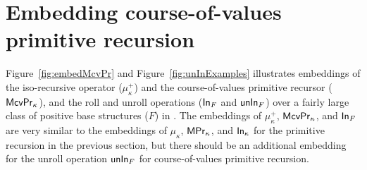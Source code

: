 \section{Embedding course-of-values primitive recursion}
\label{sec:fixi:cv}
Figure~\ref{fig:embedMcvPr} and Figure~\ref{fig:unInExamples}
illustrates embeddings of the iso-recursive operator ($\mu^{+}_\kappa$) and
the course-of-values primitive recursor ($\mathsf{McvPr}_\kappa$), and
the roll and unroll operations ($\mathsf{In}_F$ and $\mathsf{unIn}_F$) over
a fairly large class of positive base structures ($F$) in \Fixi.
The embeddings of $\mu^{+}_\kappa$, $\mathsf{McvPr}_\kappa$, and $\mathsf{In}_F$
are very similar to the embeddings of $\mu_\kappa$, $\mathsf{MPr}_\kappa$,
and $\mathsf{In}_\kappa$ for the primitive recursion in the previous section,
but there should be an additional embedding for the unroll operation $\mathsf{unIn}_F$
for course-of-values primitive recursion.


